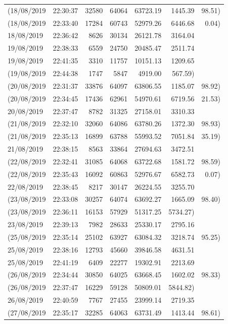 \begin{longtable}{llrrrrr}
(18/08/2019 & 22:30:37 & 32580 & 64064 & 63723.19 & 1445.39 & 98.51) \\
(18/08/2019 & 22:33:40 & 17284 & 60743 & 52979.26 & 6446.68 & 0.04) \\
18/08/2019 & 22:36:42 & 8626 & 30134 & 26121.78 & 3164.04 &  \\
19/08/2019 & 22:38:33 & 6559 & 24750 & 20485.47 & 2511.74 &  \\
19/08/2019 & 22:41:35 & 3310 & 11757 & 10151.13 & 1209.65 &  \\
(19/08/2019 & 22:44:38 & 1747 & 5847 & 4919.00 & 567.59) &  \\
(20/08/2019 & 22:31:37 & 33876 & 64097 & 63806.55 & 1185.07 & 98.92) \\
(20/08/2019 & 22:34:45 & 17436 & 62961 & 54970.61 & 6719.56 & 21.53) \\
20/08/2019 & 22:37:47 & 8782 & 31325 & 27158.01 & 3310.33 &  \\
(21/08/2019 & 22:32:10 & 32060 & 64086 & 63780.26 & 1372.30 & 98.93) \\
(21/08/2019 & 22:35:13 & 16899 & 63788 & 55993.52 & 7051.84 & 35.19) \\
21/08/2019 & 22:38:15 & 8563 & 33864 & 27694.63 & 3472.51 &  \\
(22/08/2019 & 22:32:41 & 31085 & 64068 & 63722.68 & 1581.72 & 98.59) \\
(22/08/2019 & 22:35:43 & 16092 & 60863 & 52976.67 & 6582.73 & 0.07) \\
22/08/2019 & 22:38:45 & 8217 & 30147 & 26224.55 & 3255.70 &  \\
(23/08/2019 & 22:33:08 & 30257 & 64074 & 63692.27 & 1665.09 & 98.40) \\
(23/08/2019 & 22:36:11 & 16153 & 57929 & 51317.25 & 5734.27) &  \\
23/08/2019 & 22:39:13 & 7982 & 28633 & 25330.17 & 2795.16 &  \\
(25/08/2019 & 22:35:14 & 25102 & 63927 & 63084.32 & 3218.74 & 95.25) \\
25/08/2019 & 22:38:16 & 12793 & 45660 & 39846.58 & 4631.51 &  \\
25/08/2019 & 22:41:19 & 6409 & 22277 & 19302.91 & 2213.69 &  \\
(26/08/2019 & 22:34:44 & 30850 & 64025 & 63668.45 & 1602.02 & 98.33) \\
(26/08/2019 & 22:37:47 & 16229 & 59128 & 50809.01 & 5844.82) &  \\
26/08/2019 & 22:40:59 & 7767 & 27455 & 23999.14 & 2719.35 &  \\
(27/08/2019 & 22:35:17 & 32285 & 64063 & 63731.49 & 1413.44 & 98.61) \\

\end{longtable}
